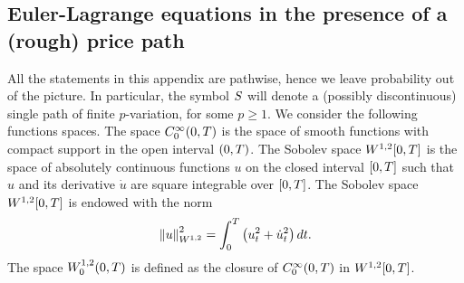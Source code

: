 \documentclass[10pt,a4paper]{article}
\begin{document}
\begin{appendices}
\section{Euler-Lagrange equations in the presence of a (rough) price path} \label{sec.eulerLagrangeInPresenceOfPricePath}
All the statements in this appendix are pathwise, hence we leave probability out of the picture. In particular, the symbol $\fundamentalPrice$ will denote a (possibly discontinuous) single path of finite $p$-variation, for some $p\geq 1$. We consider the following functions spaces. The space $\smoothCompactlySupportedFunctions(0,\timeHorizon)$ is the space of smooth functions with compact support in the open interval $(0,\timeHorizon)$. The Sobolev space $\sobolevSpaceOneTwo\timeWindow$ is the space of absolutely continuous functions $u$ on the closed interval $\timeWindow$ such that $u$ and its derivative  $\dot{u}$ are square integrable over $\timeWindow$. The Sobolev space  $\sobolevSpaceOneTwo\timeWindow$ is endowed with the norm 
\begin{equation*}
\norm[u]\squared _{\sobolevSpaceOneTwo} = \int_{0}^{\timeHorizon} \left(u_t\squared + \dot{u}_t\squared \right) dt. 
\end{equation*}
The space $\sobolevSpaceOneTwoCompactSupport(0,\timeHorizon)$ is defined as the closure of $\smoothCompactlySupportedFunctions(0,\timeHorizon)$ in  $\sobolevSpaceOneTwo\timeWindow$. 


\end{appendices}
\end{document}
